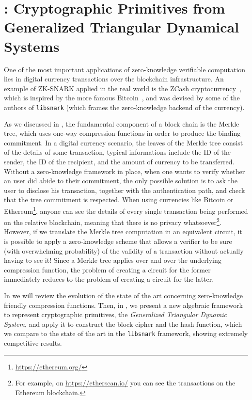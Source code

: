 \chapter{\Arion: Cryptographic Primitives from Generalized Triangular Dynamical Systems}\label{chap:arion}
One of the most important applications of zero-knowledge verifiable computation lies in digital 
currency transactions over the blockchain infrastructure.
An example of ZK-SNARK applied in the real world is the ZCash cryptocurrency~\cite{SassonCGGMTV2014}, 
which is inspired by the more famous Bitcoin~\cite{NarayananBFMG2016}, and was devised by some of 
the authors of \texttt{libsnark} (which frames the zero-knowledge backend of the currency).

As we discussed in , the fundamental component of a block chain is the 
Merkle tree, which uses one-way compression functions in order to produce the binding 
commitment.
In a digital currency scenario, the leaves of the Merkle tree consist of the details of some 
transaction, typical informations include the ID of the sender, the ID of the recipient, and the 
amount of currency to be transferred. 
Without a zero-knowledge framework in place, when one wants to verify whether an user did abide to 
their commitment, the only possible solution is to ask the user to disclose his transaction, 
together with the authentication path, and check that the tree commitment is respected. 
When using currencies like Bitcoin or Ethereum\footnote{\url{https://ethereum.org/}}, anyone 
can see the details of every single transaction being performed on the relative 
blockchain, meaning that there is no privacy whatsoever\footnote{For example, on 
\url{https://etherscan.io/} you can see the transactions on the Ethereum blockchain. %
}.
However, if we translate the Merkle tree computation in an equivalent circuit, it is possible to 
apply a zero-knowledge scheme that allows a verifier to be sure (with overwhelming probability) 
of the validity of a transaction without actually having to see it!
Since a Merkle tree applies over and over the underlying compression function, the problem of 
creating a circuit for the former immediately reduces to the problem of creating a circuit for the 
latter.

In  we will review the evolution of the state of the art concerning zero-knowledge 
friendly compression functions.
Then, in , we present a new algebraic framework to represent cryptographic 
primitives, the \emph{Generalized Triangular Dynamic System}, and apply it to construct the 
\Arion{} block cipher and the \Arionhash{} hash function, which we compare to the state of 
the art in the \texttt{libsnark} framework, showing extremely competitive results.


